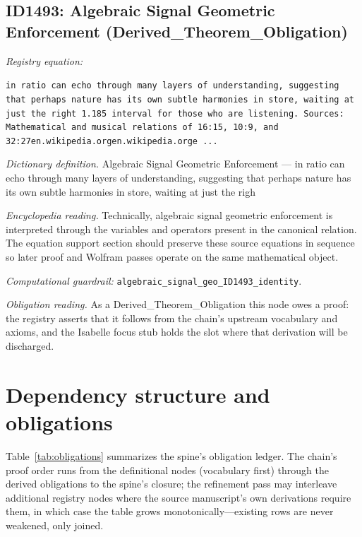 \documentclass[11pt]{article}
\theoremstyle{remark}
\begin{document}
\subsection{ID1493: Algebraic Signal Geometric Enforcement (Derived\_Theorem\_Obligation)}

\noindent\textit{Registry equation:}\par
{\small\texttt{in ratio can echo through many layers of understanding, suggesting that perhaps nature has its own subtle harmonies in store, waiting at just the right 1.185 interval for those who are listening. Sources:   Mathematical and musical relations of 16:15, 10:9, and 32:27en.wikipedia.orgen.wikipedia.orge ...}}\par\medskip
\noindent\textit{Dictionary definition.} Algebraic Signal Geometric Enforcement --- in ratio can echo through many layers of understanding, suggesting that perhaps nature has its own subtle harmonies in store, waiting at just the righ\par\medskip
\noindent\textit{Encyclopedia reading.} Technically, algebraic signal geometric enforcement is interpreted through the variables and operators present in the canonical relation. The equation support section should preserve these source equations in sequence so later proof and Wolfram passes operate on the same mathematical object.
\par\medskip\noindent\textit{Computational guardrail:} \texttt{algebraic\_signal\_geo\_ID1493\_identity}.
\par\medskip\noindent\textit{Obligation reading.} As a Derived\_Theorem\_Obligation this node owes a proof: the registry asserts that it follows from the chain's upstream vocabulary and axioms, and the Isabelle focus stub holds the slot where that derivation will be discharged.

\section{Dependency structure and obligations}
\label{sec:dep}

Table~\ref{tab:obligations} summarizes the spine's obligation ledger. The chain's proof order runs from the definitional nodes (vocabulary first) through the derived obligations to the spine's closure; the refinement pass may interleave additional registry nodes where the source manuscript's own derivations require them, in which case the table grows monotonically---existing rows are never weakened, only joined.
\end{document}
